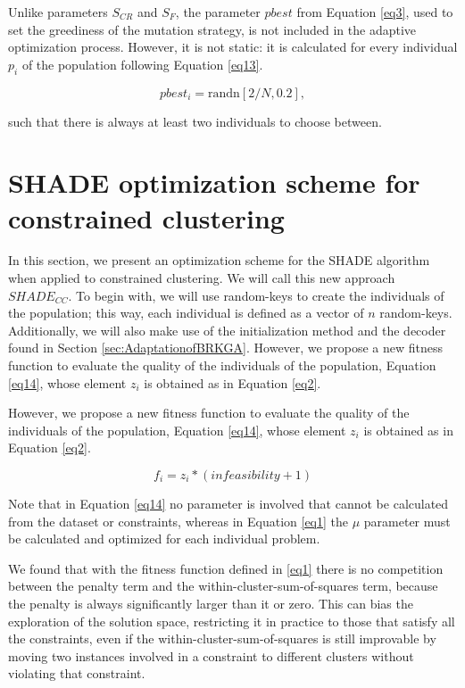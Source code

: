 \documentclass[review]{elsarticle}
\begin{document}
Unlike parameters $S_{CR}$ and $S_F$, the parameter $pbest$ from Equation \eqref{eq3}, used to set the greediness of the mutation strategy, is not included in the adaptive optimization process. However, it is not static: it is calculated for every individual $p_i$ of the population following Equation \eqref{eq13}.

\begin{equation}
pbest_i = \text{randn}[2/N, 0.2],
\label{eq13}
\end{equation}

\noindent such that there is always at least two individuals to choose between.

\section{SHADE optimization scheme for constrained clustering} \label{sec:SHADEadapt}

In this section, we present an optimization scheme for the SHADE algorithm when applied to constrained clustering. We will call this new approach $SHADE_{CC}$. To begin with, we will use random-keys to create the individuals of the population; this way, each individual is defined as a vector of $n$ random-keys. Additionally, we will also make use of the initialization method and the decoder found in Section \ref{sec:AdaptationofBRKGA}. However, we propose a new fitness function to evaluate the quality of the individuals of the population, Equation \eqref{eq14}, whose element $z_i$ is obtained as in Equation \eqref{eq2}.

However, we propose a new fitness function to evaluate the quality of the individuals of the population, Equation \eqref{eq14}, whose element $z_i$ is obtained as in Equation \eqref{eq2}.

\begin{equation}
f_i = z_i * (infeasibility + 1)
\label{eq14}
\end{equation}

Note that in Equation \eqref{eq14} no parameter is involved that cannot be calculated from the dataset or constraints, whereas in Equation \eqref{eq1} the $\mu$ parameter must be calculated and optimized for each individual problem.

We found that with the fitness function defined in \eqref{eq1} there is no competition between the penalty term and the within-cluster-sum-of-squares term, because the penalty is always significantly larger than it or zero. This can bias the exploration of the solution space, restricting it in practice to those that satisfy all the constraints, even if the within-cluster-sum-of-squares is still improvable by moving two instances involved in a constraint to different clusters without violating that constraint.
\end{document}
